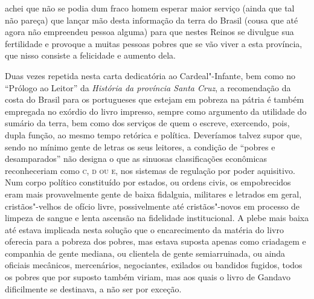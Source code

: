 \begin{hedraquote}
achei que não se podia dum fraco homem esperar maior serviço (ainda que
tal não pareça) que lançar mão desta informação da terra do Brasil
(cousa que até agora não empreendeu pessoa alguma) para que nestes Reinos
se divulgue sua fertilidade e provoque a muitas pessoas pobres que se
vão viver a esta província, que nisso consiste a felicidade e aumento dela.
\end{hedraquote}

Duas vezes repetida nesta carta dedicatória ao Cardeal"-Infante, bem como
no ``Prólogo ao Leitor'' da \textit{História da província Santa Cruz}, 
a recomendação da costa do Brasil para os
portugueses que estejam em pobreza na pátria é também empregada no
exórdio do livro impresso, sempre como argumento da utilidade do
sumário da terra, bem como dos serviços de quem o escreve, exercendo,
pois, dupla função, ao mesmo tempo retórica e política. Deveríamos
talvez supor que, sendo no mínimo gente de letras os seus leitores, a
condição de ``pobres e desamparados'' não designa o que as sinuosas 
classificações econômicas reconheceriam como
\textsc{c, d ou e}, nos sistemas de regulação por poder aquisitivo. Num corpo
político constituído por estados, ou ordens civis, os empobrecidos eram
mais provavelmente gente de baixa fidalguia, militares e letrados em
geral, cristãos"-velhos de ofício livre, possivelmente até
cristãos"-novos em processo de limpeza de sangue e lenta ascensão na
fidelidade institucional. A plebe mais baixa até estava implicada nesta
solução que o encarecimento da matéria do livro oferecia para a pobreza
dos pobres, mas estava suposta apenas como criadagem e companhia de
gente mediana, ou clientela de gente semiarruinada, ou ainda oficiais
mecânicos, mercenários, negociantes, exilados ou bandidos fugidos,
todos os pobres que por suposto também viriam, mas aos quais o livro de
Gandavo dificilmente se destinava, a não ser por exceção.

